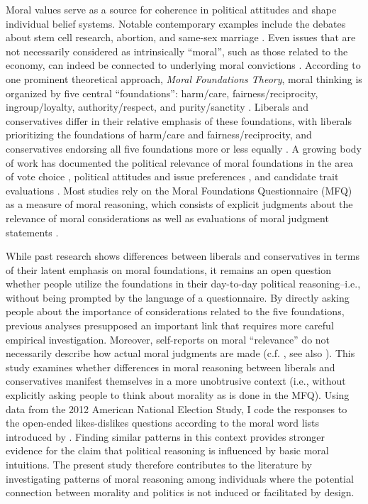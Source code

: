\documentclass[12pt]{article}
\begin{document}
Moral values serve as a source for coherence in political attitudes and shape individual belief systems. Notable contemporary examples include the debates about stem cell research, abortion, and same-sex marriage \citep[e.g.][]{koleva2012tracing,clifford2015concerns}. Even issues that are not necessarily considered as intrinsically ``moral'', such as those related to the economy, can indeed be connected to underlying moral convictions \citep{ryan2014reconsidering}. According to one prominent theoretical approach, \textit{Moral Foundations Theory}, moral thinking is organized by five central ``foundations'': harm/care, fairness/reciprocity, ingroup/loyalty, authority/respect, and purity/sanctity \citep{haidt2008moral}. Liberals and conservatives differ in their relative emphasis of these foundations, with liberals prioritizing the foundations of harm/care and fairness/reciprocity, and conservatives endorsing all five foundations more or less equally \citep{graham2009liberals}. A growing body of work has documented the political relevance of moral foundations in the area of vote choice \citep{iyer2010beyond, franks2015using}, political attitudes and issue preferences \citep{koleva2012tracing, low2015moral, clifford2015concerns}, and candidate trait evaluations \citep{clifford2014linking}. Most studies rely on the Moral Foundations Questionnaire (MFQ) as a measure of moral reasoning, which consists of explicit judgments about the relevance of moral considerations as well as evaluations of moral judgment statements \citep[e.g.][]{graham2011mapping}.

While past research shows differences between liberals and conservatives in terms of their latent emphasis on moral foundations, it remains an open question whether people utilize the foundations in their day-to-day political reasoning--i.e., without being prompted by the language of a questionnaire. By directly asking people about the importance of considerations related to the five foundations, previous analyses presupposed an important link that requires more careful empirical investigation. Moreover, self-reports on moral ``relevance'' do not necessarily describe how actual moral judgments are made (c.f. \citealt[1031]{graham2009liberals}, see also \citealt{clifford2015moral}). This study examines whether differences in moral reasoning between liberals and conservatives manifest themselves in a more unobtrusive context (i.e., without explicitly asking people to think about morality as is done in the MFQ). Using data from the 2012 American National Election Study, I code the responses to the open-ended likes-dislikes questions according to the moral word lists introduced by \citet{graham2009liberals}. Finding similar patterns in this context provides stronger evidence for the claim that political reasoning is influenced by basic moral intuitions. The present study therefore contributes to the literature by investigating patterns of moral reasoning among individuals where the potential connection between morality and politics is not induced or facilitated by design.
\end{document}
